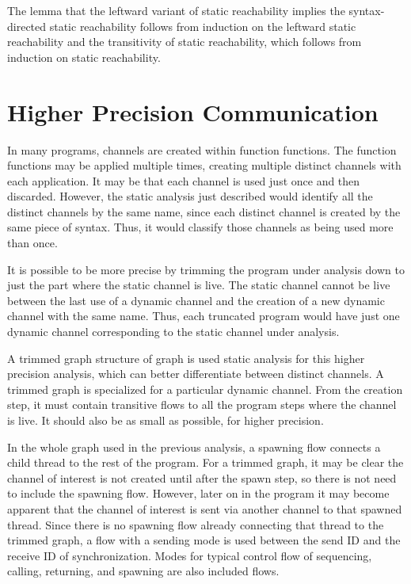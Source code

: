 \documentclass[10pt]{article}
\begin{document}
The lemma that the leftward variant of static reachability implies the syntax-directed static
reachability follows from induction on the leftward static reachability and the
transitivity of static
reachability, which follows from induction on static reachability.

\section{Higher Precision Communication}
In many programs, channels are created within function functions.  The function functions
may be applied multiple times, creating multiple distinct channels with each application.
It may be that each channel is used just once and then discarded.  However, the static
analysis just described would identify all the distinct channels by the same name, since each
distinct channel is created by the same piece of syntax. Thus, it would classify those channels
as being used more than once.

It is possible to be more precise by trimming the program under analysis down to just the part
where the static channel is live. The static channel cannot be live between the last use of a
dynamic channel and the creation of a new dynamic channel with the same name.  Thus, each
truncated program would have just one dynamic channel corresponding to the static channel under
analysis. 

A trimmed graph structure of graph is used static analysis for this higher precision
analysis, which can better differentiate between distinct channels. 
A trimmed graph is specialized for a particular dynamic channel.  From the creation
step, it must contain transitive flows to all the program steps where the
channel is live. It should also be as small as possible, for higher precision.

In the whole graph used in the previous analysis, a spawning flow
connects a child thread to the rest of the program.  For a trimmed graph,
it may be clear the channel of interest is not created until after the spawn step,
so there is not need to include the spawning flow.  However, later on in the
program it may become apparent that the channel of interest is sent via another channel to
that spawned thread.  Since there is no spawning flow already connecting that
thread to the trimmed graph, a flow with a sending mode is used between the
send ID and the receive ID of synchronization. Modes for typical control flow of
sequencing, calling, returning, and spawning are also included flows.
\end{document}
